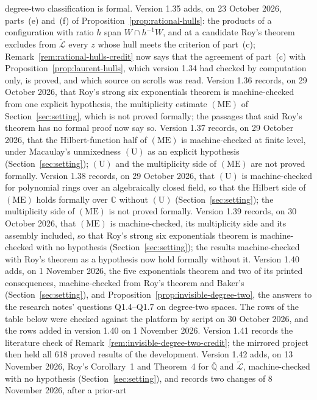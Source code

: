 \documentclass[11pt,a4paper]{article}
\theoremstyle{plain}
\theoremstyle{definition}
\newcommand{\Alg}{\overline{\mathbb{Q}}}
\newcommand{\aLogs}{\widetilde{\mathcal{L}}}
\begin{document}
degree-two classification is formal.
Version 1.35 adds, on 23 October 2026, parts~(e) and~(f) of Proposition~\ref{prop:rational-hulls}: the products of a configuration
with ratio $h$ span $W\cap h^{-1}W$, and at a candidate Roy's theorem excludes from $\aLogs$ every $z$ whose hull
meets the criterion of part~(c); Remark~\ref{rem:rational-hulls-credit} now says that the agreement of part~(c) with Proposition~\ref{prop:laurent-hulls},
which version 1.34 had checked by computation only, is proved, and which source on scrolls was read.
Version 1.36 records, on 29 October 2026, that Roy's strong six exponentials theorem is machine-checked from one
explicit hypothesis, the multiplicity estimate $(\mathrm{ME})$ of Section~\ref{sec:setting}, which is not proved
formally; the passages that said Roy's theorem has no formal proof now say so.
Version 1.37 records, on 29 October 2026, that the Hilbert-function half of $(\mathrm{ME})$ is machine-checked at
finite level, under Macaulay's unmixedness $(\mathrm{U})$ as an explicit hypothesis (Section~\ref{sec:setting});
$(\mathrm{U})$ and the multiplicity side of $(\mathrm{ME})$ are not proved formally.
Version 1.38 records, on 29 October 2026, that $(\mathrm{U})$ is machine-checked for polynomial rings over an
algebraically closed field, so that the Hilbert side of $(\mathrm{ME})$ holds formally over $\mathbb{C}$ without
$(\mathrm{U})$ (Section~\ref{sec:setting}); the multiplicity side of $(\mathrm{ME})$ is not proved formally.
Version 1.39 records, on 30 October 2026, that $(\mathrm{ME})$ is machine-checked, its multiplicity side and its
assembly included, so that Roy's strong six exponentials theorem is machine-checked with no hypothesis
(Section~\ref{sec:setting}); the results machine-checked with Roy's theorem as a hypothesis now hold
formally without it.
Version 1.40 adds, on 1 November 2026, the five exponentials theorem and two of its printed consequences, machine-checked
from Roy's theorem and Baker's (Section~\ref{sec:setting}), and Proposition~\ref{prop:invisible-degree-two}, the
answers to the research notes' questions Q1.4--Q1.7 on degree-two spaces.
The rows of the table below were checked against the platform by script on 30 October 2026, and the rows added
in version 1.40 on 1 November 2026. Version 1.41 records the literature check of
Remark~\ref{rem:invisible-degree-two-credit}; the mirrored project then held all 618 proved results of the development.
Version 1.42 adds, on 13 November 2026, Roy's Corollary~1 and Theorem~4 for $\Alg$ and $\aLogs$, machine-checked
with no hypothesis (Section~\ref{sec:setting}), and records two changes of 8 November 2026, after a prior-art
\end{document}
